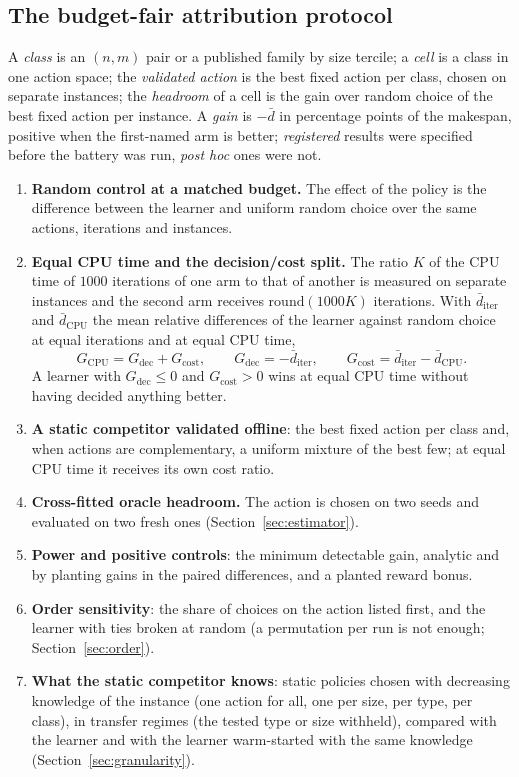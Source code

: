 \subsection{The budget-fair attribution protocol}
\label{sec:protocol}
A \emph{class} is an $(n,m)$ pair or a published family by size tercile; a \emph{cell} is a class in one action space; the \emph{validated action} is the best fixed action per class, chosen on separate instances; the \emph{headroom} of a cell is the gain over random choice of the best fixed action per instance. A \emph{gain} is $-\bar d$ in percentage points of the makespan, positive when the first-named arm is better; \emph{registered} results were specified before the battery was run, \emph{post hoc} ones were not.
\begin{enumerate}
\item \textbf{Random control at a matched budget.} The effect of the policy is the difference between the learner and uniform random choice over the same actions, iterations and instances.
\item \textbf{Equal CPU time and the decision/cost split.} The ratio $K$ of the CPU time of $1000$ iterations of one arm to that of another is measured on separate instances and the second arm receives $\mathrm{round}(1000K)$ iterations. With $\bar d_{\mathrm{iter}}$ and $\bar d_{\mathrm{CPU}}$ the mean relative differences of the learner against random choice at equal iterations and at equal CPU time,
\begin{equation}
G_{\mathrm{CPU}}=G_{\mathrm{dec}}+G_{\mathrm{cost}},\qquad G_{\mathrm{dec}}=-\bar d_{\mathrm{iter}},\qquad G_{\mathrm{cost}}=\bar d_{\mathrm{iter}}-\bar d_{\mathrm{CPU}}.
\label{eq:decomp}
\end{equation}
A learner with $G_{\mathrm{dec}}\le0$ and $G_{\mathrm{cost}}>0$ wins at equal CPU time without having decided anything better.
\item \textbf{A static competitor validated offline}: the best fixed action per class and, when actions are complementary, a uniform mixture of the best few; at equal CPU time it receives its own cost ratio.
\item \textbf{Cross-fitted oracle headroom.} The action is chosen on two seeds and evaluated on two fresh ones (Section~\ref{sec:estimator}).
\item \textbf{Power and positive controls}: the minimum detectable gain, analytic and by planting gains in the paired differences, and a planted reward bonus.
\item \textbf{Order sensitivity}: the share of choices on the action listed first, and the learner with ties broken at random (a permutation per run is not enough; Section~\ref{sec:order}).
\item \textbf{What the static competitor knows}: static policies chosen with decreasing knowledge of the instance (one action for all, one per size, per type, per class), in transfer regimes (the tested type or size withheld), compared with the learner and with the learner warm-started with the same knowledge (Section~\ref{sec:granularity}).
\end{enumerate}


